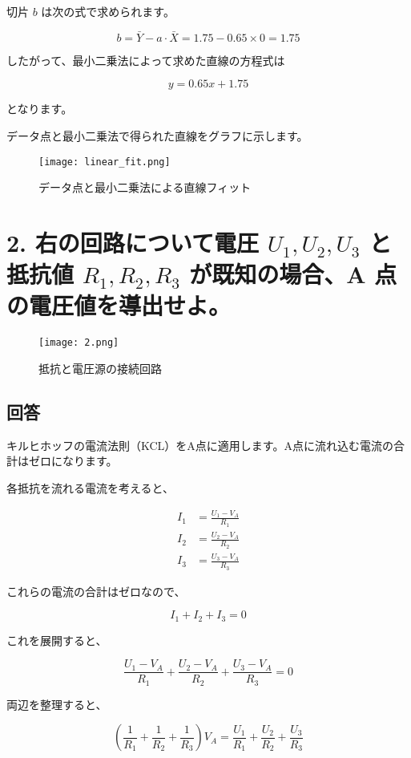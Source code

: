 \documentclass{article}
\begin{document}
切片 \(b\) は次の式で求められます。

\[
b = \bar{Y} - a \cdot \bar{X} = 1.75 - 0.65 \times 0 = 1.75
\]

したがって、最小二乗法によって求めた直線の方程式は

\[
y = 0.65x + 1.75
\]

となります。

データ点と最小二乗法で得られた直線をグラフに示します。

\begin{figure}[H]
    \centering
    \texttt{[image: linear\_fit.png]}
    \caption{データ点と最小二乗法による直線フィット}
\end{figure}

\newpage  %

\section*{2. 右の回路について電圧 \(U_1, U_2, U_3\) と抵抗値 \(R_1, R_2, R_3\) が既知の場合、A 点の電圧値を導出せよ。}
\begin{figure}[H]
    \centering
    \texttt{[image: 2.png]}
    \caption{抵抗と電圧源の接続回路}
\end{figure}

\subsection*{回答}
キルヒホッフの電流法則（KCL）をA点に適用します。A点に流れ込む電流の合計はゼロになります。

各抵抗を流れる電流を考えると、

\[
\begin{aligned}
I_1 &= \frac{U_1 - V_A}{R_1} \\
I_2 &= \frac{U_2 - V_A}{R_2} \\
I_3 &= \frac{U_3 - V_A}{R_3}
\end{aligned}
\]

これらの電流の合計はゼロなので、

\[
I_1 + I_2 + I_3 = 0
\]

これを展開すると、

\[
\frac{U_1 - V_A}{R_1} + \frac{U_2 - V_A}{R_2} + \frac{U_3 - V_A}{R_3} = 0
\]

両辺を整理すると、

\[
\left( \frac{1}{R_1} + \frac{1}{R_2} + \frac{1}{R_3} \right) V_A = \frac{U_1}{R_1} + \frac{U_2}{R_2} + \frac{U_3}{R_3}
\]
\end{document}
